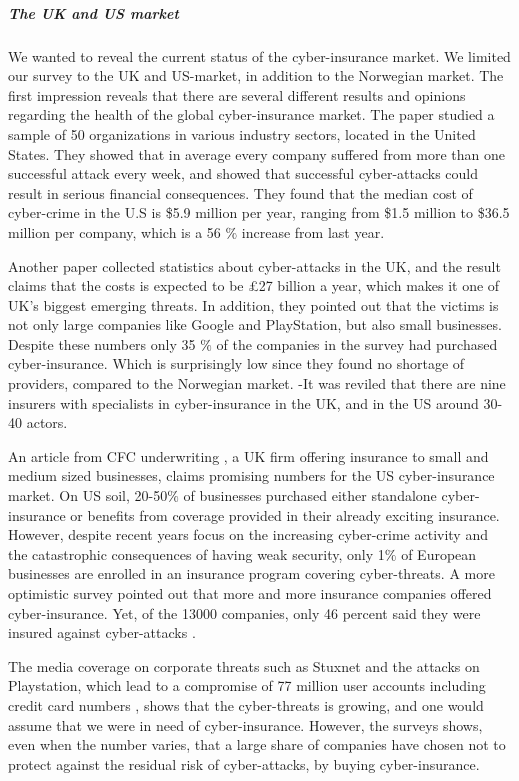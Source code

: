 \subparagraph{The UK and US market}
We wanted to reveal the current status of the cyber-insurance market. We limited our survey to the UK and US-market, in addition to the Norwegian market. 
The first impression reveals that there are several different results and opinions regarding the health of the global cyber-insurance market. 
The paper \cite{ccost} studied a sample of 50 organizations in various industry sectors, located in the United States. They showed that in average every company suffered from more than one successful attack every week, and showed that successful cyber-attacks could result in serious financial consequences. They found that the median cost of cyber-crime in the U.S is \$5.9 million per year, ranging from \$1.5 million to \$36.5 million per company, which is a 56 $\%$ increase from last year. 
 
 Another paper \cite{evolvingcyber} collected statistics about cyber-attacks in the UK, and the result claims that the costs is expected to be \pounds 27 billion a year, which makes it one of UK's biggest emerging threats. In addition, they pointed out that the victims is not only large companies like Google and PlayStation, but also small businesses. Despite these numbers only 35 $\%$ of the companies in the survey had purchased cyber-insurance. Which is surprisingly low since they found no shortage of providers, compared to the Norwegian market. -It was reviled that there are nine insurers with specialists in cyber-insurance in the UK, and in the US around 30-40 actors.  
 
 
 An article from CFC underwriting \cite{CFCunder}, a UK firm offering insurance to small and medium sized businesses, claims promising numbers for the US cyber-insurance market. On US soil, 20-50$\%$ of businesses purchased either standalone cyber-insurance or benefits from coverage provided in their already exciting insurance. However, despite recent years focus on the increasing cyber-crime activity and the catastrophic consequences of having weak security, only 1$\%$ of European businesses are enrolled in an insurance program covering cyber-threats.
A more optimistic survey pointed out that more and more insurance companies offered cyber-insurance. Yet, of the 13000 companies, only 46 percent said they were insured against cyber-attacks \cite{compworld}. 
 
 The media coverage on corporate threats such as Stuxnet and the attacks on Playstation, which lead to a compromise of 77 million user accounts including credit card numbers \cite{playstation}, shows that the cyber-threats is growing, and one would assume that we were in need of cyber-insurance. However, the surveys shows, even when the number varies, that a large share of companies have chosen not to protect against the residual risk of cyber-attacks, by buying cyber-insurance.


